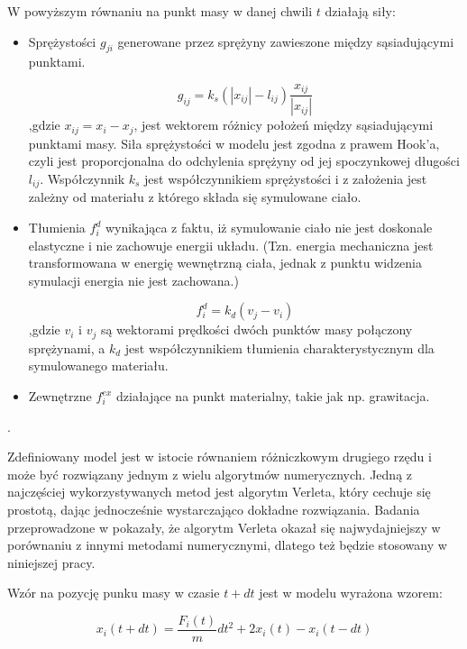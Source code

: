 W powyższym równaniu na punkt masy w danej chwili $t$ działają siły:
\begin{itemize}
\item  Sprężystości $g_{ji}$ generowane przez sprężyny zawieszone między sąsiadującymi punktami.

\begin{equation}
g_{ij} = k_s (| x_{ij}| - l_{ij})\frac{x_{ij}}{|x_{ij}|}
\end{equation}
,gdzie $x_{ij} = x_i - x_j$, jest wektorem różnicy położeń między sąsiadującymi punktami masy. Siła sprężystości w modelu jest zgodna z prawem Hook'a, czyli jest proporcjonalna do odchylenia sprężyny od jej spoczynkowej długości $l_{ij}$. Współczynnik $k_s$ jest współczynnikiem sprężystości i z założenia jest zależny od materiału z którego składa się symulowane ciało.

\item Tłumienia $f^{d}_i$ wynikająca z faktu, iż symulowanie ciało nie jest doskonale elastyczne i nie zachowuje energii układu. (Tzn. energia mechaniczna jest transformowana w energię wewnętrzną ciała, jednak z punktu widzenia symulacji energia nie jest zachowana.)

\begin{equation}
f^{d}_i = k_d(v_j - v_i)
\end{equation}
,gdzie $v_i$ i $v_j$ są wektorami prędkości dwóch punktów masy połączony sprężynami, a $ k_d$ jest współczynnikiem tłumienia charakterystycznym dla symulowanego materiału.

\item Zewnętrzne $f^{ex}_{i}$ działające na punkt materialny, takie jak np. grawitacja.
\end{itemize}. 

Zdefiniowany model jest w istocie równaniem różniczkowym drugiego rzędu i może
być rozwiązany jednym z wielu algorytmów numerycznych. Jedną z najczęściej
wykorzystywanych metod jest algorytm Verleta, który cechuje się prostotą, dając
jednocześnie wystarczająco dokładne rozwiązania. Badania przeprowadzone w \cite{var} pokazały, że algorytm Verleta okazał się najwydajniejszy w porównaniu z innymi metodami numerycznymi, dlatego też będzie stosowany w niniejszej pracy.

Wzór na pozycję punku masy w czasie $t + dt$ jest w modelu wyrażona wzorem:

\begin{equation}
x_i(t + dt) = \frac{F_i(t)}{m} dt^2 + 2x_i(t) - x_i(t - dt)
\end{equation}

